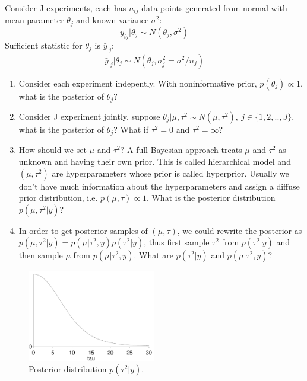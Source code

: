 \documentclass{harvardml}
\theoremstyle{definition}
\theoremstyle{plain}
\begin{document}
Consider J experiments, each has $n_{ij}$ data points generated from normal with mean parameter $\theta_j$ and known variance $\sigma^2$:
$$y_{ij}|\theta_j \sim N(\theta_j, \sigma^2)$$
Sufficient statistic for $\theta_j$ is $\bar y_{.j}$: $$\bar y_{.j}|\theta_j \sim N(\theta_j, \sigma^2_j = \sigma^2/n_j)$$
\begin{enumerate}
\item Consider each experiment indepently. With noninformative prior, $p(\theta_j) \propto 1$, what is the posterior of $\theta_j$?
\item Consider J experiment jointly, suppose $\theta_j|\mu, \tau^2 \sim N(\mu, \tau^2),\ j \in \{1,2,..,J\}$, what is the posterior of $\theta_j$? What if $\tau^2 = 0 $ and $\tau^2 = \infty$?
\item How should we set $\mu$ and $\tau^2$? A full Bayesian approach treats $\mu$ and $\tau^2$ as unknown and having their own prior. This is called hierarchical model and $(\mu, \tau^2)$ are hyperparameters whose prior is called hyperprior. Usually we don't have much information about the hyperparameters and assign a diffuse prior distribution, i.e. $p(\mu, \tau) \propto 1$. What is the posterior distribution $p(\mu, \tau^2|y)$? 
\item In order to get posterior samples of $(\mu, \tau)$, we could rewrite the posterior as $p(\mu, \tau^2|y) = p(\mu|\tau^2, y)p(\tau^2|y)$, thus first sample $\tau^2$ from  $p(\tau^2|y)$ and then sample $\mu$ from $ p(\mu|\tau^2, y)$. What are $p(\tau^2|y)$ and $ p(\mu|\tau^2, y)$?
\end{enumerate}
\begin{figure}[!hbt]
\center
\includegraphics[width=0.5\textwidth]{8school_post_tau.pdf}
\caption{Posterior distribution $p(\tau^2|y)$.}
\end{figure}
\end{document}
